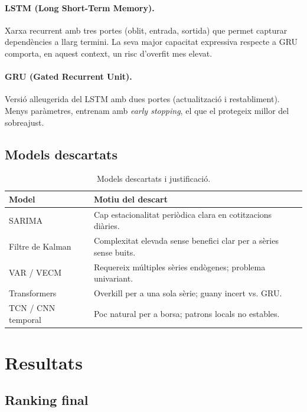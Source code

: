 \documentclass[12pt,a4paper]{article}
\begin{document}
\paragraph{LSTM (Long Short-Term Memory).} Xarxa recurrent amb tres portes (oblit,
entrada, sortida) que permet capturar dependències a llarg termini. La seva major
capacitat expressiva respecte a GRU comporta, en aquest context, un risc
d'overfit mes elevat.

\paragraph{GRU (Gated Recurrent Unit).} Versió alleugerida del LSTM amb dues
portes (actualització i restabliment). Menys paràmetres, entrenam amb \textit{early
stopping}, el que el protegeix millor del sobreajust.

\subsection{Models descartats}

\begin{table}[H]
\centering
\begin{tabular}{lp{9cm}}
\toprule
\textbf{Model} & \textbf{Motiu del descart} \\
\midrule
SARIMA & Cap estacionalitat periòdica clara en cotitzacions diàries. \\
Filtre de Kalman & Complexitat elevada sense benefici clar per a sèries sense buits. \\
VAR / VECM & Requereix múltiples sèries endògenes; problema univariant. \\
Transformers & Overkill per a una sola sèrie; guany incert vs. GRU. \\
TCN / CNN temporal & Poc natural per a borsa; patrons locals no estables. \\
\bottomrule
\end{tabular}
\caption{Models descartats i justificació.}
\end{table}

\section{Resultats}

\subsection{Ranking final}
\end{document}
